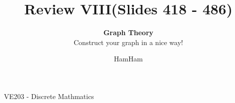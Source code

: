 \documentclass{beamer}
\title{\sffamily Review VIII(Slides 418 - 486)}
\subtitle{\textbf{Graph Theory}\\Construct your graph in a nice way!}
\institute[UM-SJTU JI]{University of Michigan-Shanghai Jiao Tong University Joint Institute}
\author{HamHam}
\newcommand{\myfont}{\rmfamily\normalsize\upshape\mdseries}
\begin{document}
\begin{titlepage}
    \begin{center}
        VE203 - Discrete Mathmatics 
    \end{center}
\end{titlepage}
\myfont
\newcommand{\binomial}[2]{\begin{pmatrix} {#1}\\{#2}	\end{pmatrix}}
\newcommand{\green}[1]{\textcolor[rgb]{0.3,0.6,0}{#1}}
\end{document}
